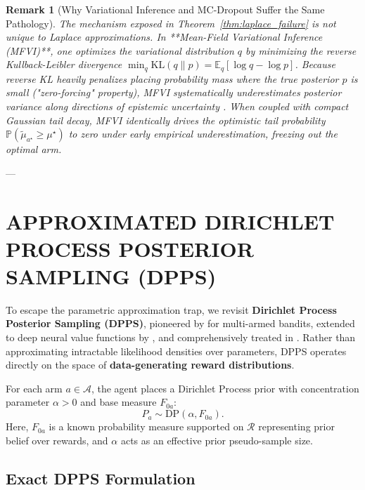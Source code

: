 \documentclass[twoside]{article}
\newtheorem{remark}{Remark}
\newcommand{\KL}{\text{KL}}
\begin{document}
\begin{remark}[Why Variational Inference and MC-Dropout Suffer the Same Pathology]
The mechanism exposed in Theorem~\ref{thm:laplace_failure} is not unique to Laplace approximations. In **Mean-Field Variational Inference (MFVI)**, one optimizes the variational distribution $q$ by minimizing the reverse Kullback-Leibler divergence $\min_q \KL(q \parallel p) = \mathbb{E}_q[\log q - \log p]$. Because reverse KL heavily penalizes placing probability mass where the true posterior $p$ is small ("zero-forcing" property), MFVI systematically underestimates posterior variance along directions of epistemic uncertainty \citep{bishop2006pattern, mackay2003information}. When coupled with compact Gaussian tail decay, MFVI identically drives the optimistic tail probability $\mathbb{P}(\tilde{\mu}_{a^\star} \ge \mu^\star)$ to zero under early empirical underestimation, freezing out the optimal arm.
\end{remark}

---

\section{APPROXIMATED DIRICHLET PROCESS POSTERIOR SAMPLING (DPPS)}
\label{sec:dpps}

To escape the parametric approximation trap, we revisit \textbf{Dirichlet Process Posterior Sampling (DPPS)}, pioneered by \citet{vashishtha2025leveraging} for multi-armed bandits, extended to deep neural value functions by \citet{vashishtha2026tmlr}, and comprehensively treated in \citet{vashishtha2026thesis}. Rather than approximating intractable likelihood densities over parameters, DPPS operates directly on the space of \textbf{data-generating reward distributions}.

For each arm $a \in \mathcal{A}$, the agent places a Dirichlet Process prior \citep{ferguson1973bayesian, ghosal2010dirichlet} with concentration parameter $\alpha > 0$ and base measure $F_{0a}$:
\begin{equation}
P_a \sim \text{DP}(\alpha, F_{0a}).
\end{equation}
Here, $F_{0a}$ is a known probability measure supported on $\mathcal{R}$ representing prior belief over rewards, and $\alpha$ acts as an effective prior pseudo-sample size.

\subsection{Exact DPPS Formulation}
\end{document}
